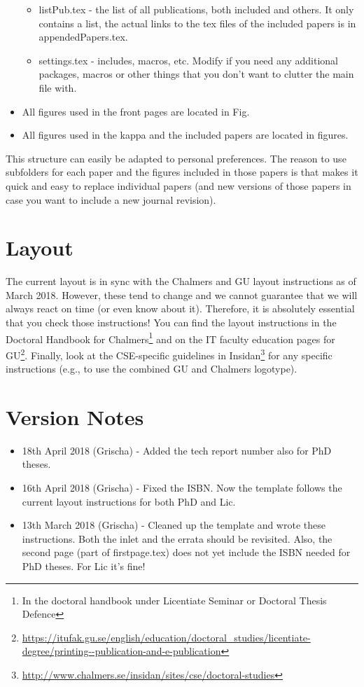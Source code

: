 \documentclass[a4paper,10pt]{article}
\begin{document}
\begin{itemize}
\begin{itemize}
        \item listPub.tex - the list of all publications, both included and others. It only contains a list, the actual links to the tex files of the included papers is in appendedPapers.tex.
        \item settings.tex - includes, macros, etc. Modify if you need any additional packages, macros or other things that you don't want to clutter the main file with.
    \end{itemize}
    \item All figures used in the front pages are located in Fig.
    \item All figures used in the kappa and the included papers are located in figures.
\end{itemize}

This structure can easily be adapted to personal preferences.
The reason to use subfolders for each paper and the figures included in those papers is that makes it quick and easy to replace individual papers (and new versions of those papers in case you want to include a new journal revision).

\section{Layout}
The current layout is in sync with the Chalmers and GU layout instructions as of March 2018.
However, these tend to change and we cannot guarantee that we will always react on time (or even know about it).
Therefore, it is absolutely essential that you check those instructions!
You can find the layout instructions in the Doctoral Handbook for Chalmers\footnote{In the doctoral handbook under Licentiate Seminar or Doctoral Thesis Defence} and on the IT faculty education pages for GU\footnote{\url{https://itufak.gu.se/english/education/doctoral_studies/licentiate-degree/printing--publication-and-e-publication}}.
Finally, look at the CSE-specific guidelines in Insidan\footnote{\url{http://www.chalmers.se/insidan/sites/cse/doctoral-studies}} for any specific instructions (e.g., to use the combined GU and Chalmers logotype).

\section{Version Notes}
\begin{itemize}
    \item 18th April 2018 (Grischa) - Added the tech report number also for PhD theses.
    \item 16th April 2018 (Grischa) - Fixed the ISBN. Now the template follows the current layout instructions for both PhD and Lic.
    \item 13th March 2018 (Grischa) - Cleaned up the template and wrote these instructions. Both the inlet and the errata should be revisited. Also, the second page (part of firstpage.tex) does not yet include the ISBN needed for PhD theses. For Lic it's fine!
\end{itemize}
\end{document}
